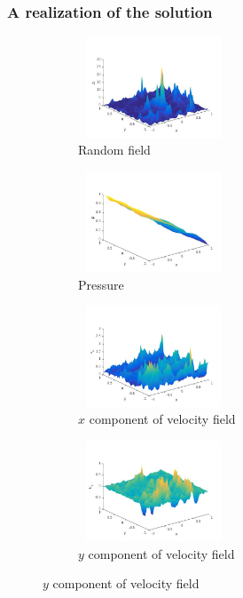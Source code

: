 \begin{frame}
\frametitle{A realization of the solution}
\begin{figure}[t]
    \centering
    \begin{subfigure}{0.49\linewidth}
        \centering
	\includegraphics[width=4.5cm,height=3cm]{Pictures/A.jpg}
        \caption{Random field}
    \end{subfigure}
    \begin{subfigure}{0.49\linewidth}
        \centering
	\includegraphics[width=4.5cm,height=3cm]{Pictures/P.jpg}
        \caption{Pressure}
    \end{subfigure}
    \begin{subfigure}{0.49\linewidth}
        \centering
	\includegraphics[width=4.5cm,height=3cm]{Pictures/Ux.jpg}
        \caption{$x$ component of velocity field}
    \end{subfigure}
    \begin{subfigure}{0.49\linewidth}
        \centering
	\includegraphics[width=4.5cm,height=3cm]{Pictures/Uy.jpg}
        \caption{$y$ component of velocity field}
    \end{subfigure} 
\end{figure}
\end{frame}

